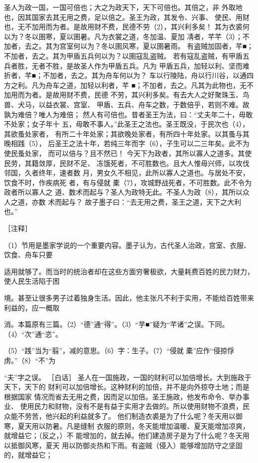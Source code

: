 \documentclass[12pt,UTF8]{ctexbook}
\begin{document}
圣人为政一国，一国可倍也；大之为政天下，天下可倍也。其倍之，非 
外取地也，因其国家去其无用之费，足以倍之。圣王为政，其发令、兴事、 
使民、用财也，无不加用而为者。是故用财不费，民德不劳（2），其兴利多矣！ 
其为衣裘何以为？冬以圉寒，夏以圉暑。凡为衣裳之道，冬加温、夏加 
凊者，芊芊（3）；不加者，去之。其为宫室何以为？冬以圉风寒，夏以圉暑雨。 
有盗贼加固者，芊■；不加者，去之。其为甲盾五兵何以为？以圉寇乱盗贼。 
若有寇乱盗贼，有甲盾五兵者胜，无者不胜，是故圣人作为甲盾五兵。凡为 
甲盾五兵，加轻以利、坚而难折者，芊■；不加者，去之。其为舟车何以为？ 
车以行陵陆，舟以行川谷，以通四方之利。凡为舟车之道，加轻以利者，芊 
■；不加者，去之。凡其为此物也，无不加用而为者。是故用财不费，民德 
不劳，其兴利多矣。有去大人之好聚珠玉、鸟兽、犬马，以益衣裳、宫室、 
甲盾、五兵、舟车之数，于数倍乎，若则不难。故孰为难倍？唯人为难倍； 
然人有可倍也。昔者圣王为法，曰：“丈夫年二十，毋敢不处家；女子年十 
五，毋敢不事人。”此圣王之法也。圣王既没，于民次也（4），其欲蚤处家者， 
有所二十年处家；其欲晚处家者，有所四十年处家。以其蚤与其晚相践（5）， 
后圣王之法十年，若纯三年而字（6），子生可以二三年矣。此不为使民蚤处家， 
而可以倍与？且不然已！ 
今天下为政者，其所以寡人之道多。其使民劳，其籍敛厚，民财不足、 
冻饿死者，不可胜数也。且大人惟毋兴师，以攻伐邻国，久者终年，速者数 
月，男女久不相见，此所以寡人之道也。与居处不安，饮食不时，作疾病死 
者，有与侵就 橐（7），攻城野战死者，不可胜数。此不令为政者所以寡人之 
道、数术而起与？圣人为政特无此。不圣人为政（8），其所以众人之道，亦数 
术而起与？ 
故子墨子曰：“去无用之费，圣王之道，天下之大利也。” 


［注释］ 

（1）节用是墨家学说的一个重要内容。墨子认为，古代圣人治政，宫室、衣服、饮食、舟车只要 

适用就够了。而当时的统治者却在这些方面穷奢极欲，大量耗费百姓的民力财力，使人民生活陷于困 

境。甚至让很多男子过着独身生活。因此，他主张凡不利于实用，不能给百姓带来利益的，应一概取 

消。本篇原有三篇。（2）“德”通“得”。（3）“芋■”疑为“芊诸”之误。下同。（4）“次”通“恣”。 

（5）“践”当为“翦”，减的意思。（6）字：生子。（7）“侵就 橐”应作“侵掠俘虏。”（8）“不”为 

“夫”字之误。 
［白话］ 
圣人在一国施政，一国的财利可以加倍增长。大到施政于天下，天下的 
财利可以加倍增长。这种财利的加倍，并不是向外掠夺土地；而是根据国家 
情况而省去无用之费，因而足以加倍。圣王施政，他发布命令、举办事业、 
使用民力和财物，没有不是有益于实用才去做的。所以使用财物不浪费，民 
众能不劳苦，他兴起的利益就多了。 
他们制造衣裘是为了什么呢？冬天用以御寒，夏天用以防暑。凡是缝制 
衣服的原则，冬天能增加温暖、夏天能增加凉爽，就增益它；（反之，）不 
能增加的，就去掉。他们建造房子是为了什么呢？冬天用以抵御风寒，夏天 
用以防御炎热和下雨。有盗贼（侵入）能够增加防守之坚固的，就增益它； 
\end{document}

